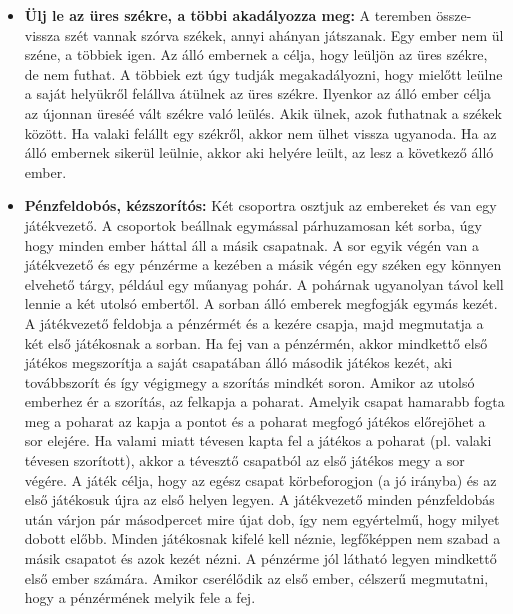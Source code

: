 \documentclass[a4paper, 12pt, twoside, openright]{article}
\begin{document}
\begin{itemize}
\item \textbf{Ülj le az üres székre, a többi akadályozza meg:} A teremben össze-vissza szét vannak szórva székek, annyi ahányan játszanak. Egy ember nem ül széne, a többiek igen. Az álló embernek a célja, hogy leüljön az üres székre, de nem futhat. A többiek ezt úgy tudják megakadályozni, hogy mielőtt leülne a saját helyükről felállva átülnek az üres székre. Ilyenkor az álló ember célja az újonnan üreséé vált székre való leülés. Akik ülnek, azok futhatnak a székek között. Ha valaki felállt egy székről, akkor nem ülhet vissza ugyanoda. Ha az álló embernek sikerül leülnie, akkor aki helyére leült, az lesz a következő álló ember.

\item \textbf{Pénzfeldobós, kézszorítós:} Két csoportra osztjuk az embereket és van egy játékvezető. A csoportok beállnak egymással párhuzamosan két sorba, úgy hogy minden ember háttal áll a másik csapatnak. A sor egyik végén van a játékvezető és egy pénzérme a kezében a másik végén egy széken egy könnyen elvehető tárgy, például egy műanyag pohár. A pohárnak ugyanolyan távol kell lennie a két utolsó embertől. A sorban álló emberek megfogják egymás kezét. A játékvezető feldobja a pénzérmét és a kezére csapja, majd megmutatja a két első játékosnak a sorban. Ha fej van a pénzérmén, akkor mindkettő első játékos megszorítja a saját csapatában álló második játékos kezét, aki továbbszorít és így végigmegy a szorítás mindkét soron. Amikor az utolsó emberhez ér a szorítás, az felkapja a poharat. Amelyik csapat hamarabb fogta meg a poharat az kapja a pontot és a poharat megfogó játékos előrejöhet a sor elejére. Ha valami miatt tévesen kapta fel a játékos a poharat (pl. valaki tévesen szorított), akkor a tévesztő csapatból az első játékos megy a sor végére. A játék célja, hogy az egész csapat körbeforogjon (a jó irányba) és az első játékosuk újra az első helyen legyen. A játékvezető minden pénzfeldobás után várjon pár másodpercet mire újat dob, így nem egyértelmű, hogy milyet dobott előbb. Minden játékosnak kifelé kell néznie, legfőképpen nem szabad a másik csapatot és azok kezét nézni. A pénzérme jól látható legyen mindkettő első ember számára. Amikor cserélődik az első ember, célszerű megmutatni, hogy a pénzérmének melyik fele a fej.


\end{itemize}
\end{document}
